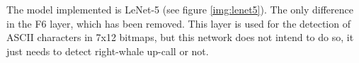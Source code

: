 \documentclass[]{article}
\begin{document}

The model implemented is LeNet-5 (see figure \ref{img:lenet5}). The only difference in the F6 layer, which has been removed. This layer is used for the detection of ASCII characters in 7x12 bitmaps, but this network does not intend to do so, it just needs to detect right-whale up-call or not.
\end{document}
